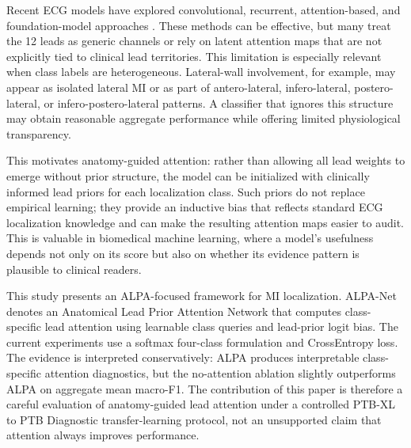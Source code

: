 \documentclass[a4paper,fleqn]{cas-dc}
\begin{document}
Recent ECG models have explored convolutional, recurrent, attention-based, and foundation-model
approaches
\cite{FengPiLiuSun2019ApplSci_MI_CNN_RNN,Hasbullah2023BioMedInformatics_MI_Hybrid_CNN_RNN,Cao2022FrontPhysiol_MSResNet_Attn_MI,HuBERTECG2024,McKeen2024ECGFM}.
These methods can be effective, but many treat the 12 leads as generic channels or rely on latent
attention maps that are not explicitly tied to clinical lead territories. This limitation is
especially relevant when class labels are heterogeneous. Lateral-wall involvement, for example, may
appear as isolated lateral MI or as part of antero-lateral, infero-lateral, postero-lateral, or
infero-postero-lateral patterns. A classifier that ignores this structure may obtain reasonable
aggregate performance while offering limited physiological transparency.

This motivates anatomy-guided attention: rather than allowing all lead weights to emerge without
prior structure, the model can be initialized with clinically informed lead priors for each
localization class. Such priors do not replace empirical learning; they provide an inductive bias
that reflects standard ECG localization knowledge and can make the resulting attention maps easier
to audit. This is valuable in biomedical machine learning, where a model's usefulness depends not
only on its score but also on whether its evidence pattern is plausible to clinical readers.

This study presents an ALPA-focused framework for MI localization. ALPA-Net denotes an Anatomical
Lead Prior Attention Network that computes class-specific lead attention using learnable class
queries and lead-prior logit bias. The current experiments use a softmax four-class formulation and
CrossEntropy loss. The evidence is interpreted conservatively: ALPA produces interpretable
class-specific attention diagnostics, but the no-attention ablation slightly outperforms ALPA on
aggregate mean macro-F1. The contribution of this paper is therefore a careful evaluation of
anatomy-guided lead attention under a controlled PTB-XL to PTB Diagnostic transfer-learning
protocol, not an unsupported claim that attention always improves performance.
\end{document}
